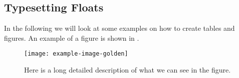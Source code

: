 \documentclass[11pt]{article}
\begin{document}
\subsection{Typesetting Floats}
\label{s:type-floats}

In the following we will look at some examples on how to create tables and figures. An example of a figure is shown in .


\begin{figure}
\centering
\texttt{[image: example-image-golden]}
\caption{Here is a long detailed description of what we can see in the figure.\label{f:golden-ratio}}
\end{figure}

\printbibliography
\end{document}
